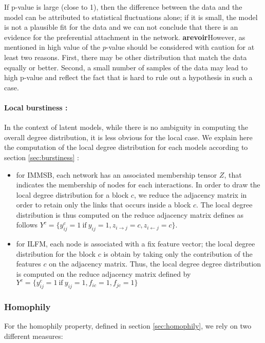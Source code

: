 \documentclass[a4paper, 12pt]{article}
\begin{document}
 If  p-value is large (close to 1), then the difference between the data and the model can be attributed to statistical fluctuations alone; if it is small, the model is not a plausible fit for the data and we can not conclude that there is an evidence for the preferential attachment in the network. 
\textbf{arevoir}However, as mentioned in \cite{clauset2009power} high value of the $p$-value should be considered with caution for at least two reasons. First, there may be other distribution that match the data equally or better. Second, a small number of samples of the data may lead to high p-value and reflect the fact that is hard to rule out a hypothesis in such a case.


\paragraph{Local burstiness : }
In the context of latent models, while there is no ambiguity in computing the overall degree distribution, it is less obvious for the local case. We explain here the computation of the local degree distribution for each models according to section \ref{sec:burstiness} :
\begin{itemize}
        \item for IMMSB, each network has an associated membership tensor $Z$, that indicates the membership of nodes for each  interactions. In order to draw the local degree distribution for a block $c$, we reduce the adjacency matrix in order to retain only the links that occurs inside a block $c$. The local degree distribution is thus computed on the reduce adjacency matrix defines as follows $Y^c =\{ y_{ij}^c=1 \ \textrm{if}\ y_{ij}=1 , z_{i\rightarrow j}=c, z_{i\leftarrow j}=c\}$.
        \item for ILFM, each node is associated with a fix feature vector; the local degree distribution for the block $c$ is obtain by taking only the contribution of the features $c$ on the adjacency matrix. Thus, the local degree degree distribution is computed on the reduce adjacency matrix defined by $Y^c =\{ y_{ij}^c=1 \ \textrm{if}\ y_{ij}=1 , f_{ic}=1, f_{jc}=1\}$
\end{itemize}

\subsubsection{Homophily}

For the homophily property, defined in section \ref{sec:homophily}, we rely on two different measures:
\end{document}
